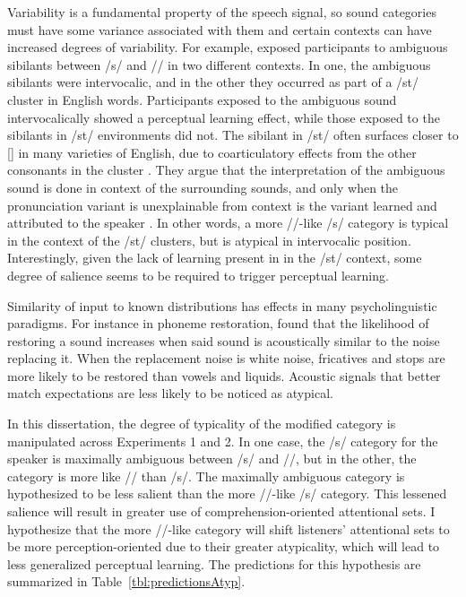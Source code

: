 Variability is a fundamental property of the speech signal, so sound categories must have some variance associated with them and certain contexts can have increased degrees of variability.
For example, \citet{Kraljic2008a} exposed participants to ambiguous sibilants between /s/ and /\textesh/ in two different contexts.  
In one, the ambiguous sibilants were intervocalic, and in the other they occurred as part of a /st\textturnr/ cluster in English words.  
Participants exposed to the ambiguous sound intervocalically showed a perceptual learning effect, while those exposed to the sibilants in /st\textturnr/ environments did not.  
The sibilant in /st\textturnr/ often surfaces closer to [\textesh] in many varieties of English, due to coarticulatory effects from the other consonants in the cluster \citep{Baker2011}.
They argue that the interpretation of the ambiguous sound is done in context of the surrounding sounds, and only when the pronunciation variant is unexplainable from context is the variant learned and attributed to the speaker \citep[see also][]{Kraljic2008}.
In other words, a more /\textesh/-like /s/ category is typical in the context of the /st\textturnr/ clusters, but is atypical in intervocalic position.
Interestingly, given the lack of learning present in in the /st\textturnr/ context, some degree of salience seems to be required to trigger perceptual learning.

Similarity of input to known distributions has effects in many psycholinguistic paradigms.
For instance in phoneme restoration, \citet{Samuel1981} found that the likelihood of restoring a sound increases when said sound is acoustically similar to the noise replacing it.  
When the replacement noise is white noise, fricatives and stops are more likely to be restored than vowels and liquids.
Acoustic signals that better match expectations are less likely to be noticed as atypical.

In this dissertation, the degree of typicality of the modified category is manipulated across Experiments 1 and 2.  
In one case, the /s/ category for the speaker is maximally ambiguous between /s/ and /\textesh/, but in the other, the category is more like /\textesh/ than /s/.
The maximally ambiguous category is hypothesized to be less salient than the more /\textesh/-like /s/ category.
This lessened salience will result in greater use of comprehension-oriented attentional sets.
I hypothesize that the more /\textesh/-like category will shift listeners' attentional sets to be more perception-oriented due to their greater atypicality, which will lead to less generalized perceptual learning.  
The predictions for this hypothesis are summarized in Table~\ref{tbl:predictionsAtyp}.

